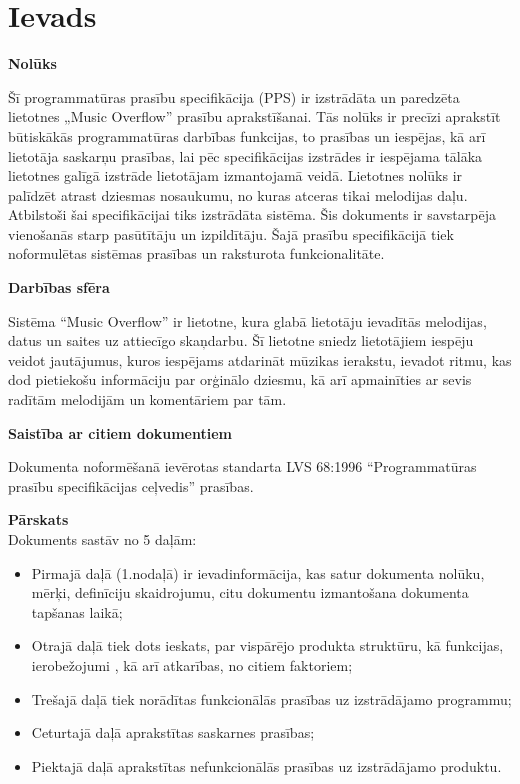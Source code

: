 \documentclass[12pt]{article}
\begin{document}
\tableofcontents

\pagebreak

\section*{Ievads}

\textbf{Nolūks}

Šī programmatūras prasību specifikācija (PPS) ir izstrādāta un paredzēta lietotnes „Music Overflow” prasību aprakstīšanai.
Tās nolūks ir precīzi aprakstīt būtiskākās programmatūras darbības funkcijas, to prasības un iespējas, kā arī lietotāja saskarņu prasības, lai pēc specifikācijas izstrādes ir iespējama tālāka lietotnes galīgā izstrāde lietotājam izmantojamā veidā.
Lietotnes nolūks ir palīdzēt atrast dziesmas nosaukumu, no kuras atceras tikai melodijas daļu.
Atbilstoši šai specifikācijai tiks izstrādāta sistēma. Šis dokuments ir savstarpēja vienošanās starp pasūtītāju un izpildītāju. Šajā prasību specifikācijā tiek noformulētas sistēmas prasības un raksturota funkcionalitāte.



\textbf{Darbības sfēra}

Sistēma ``Music Overflow'' ir lietotne, kura glabā lietotāju ievadītās melodijas, datus un saites uz attiecīgo skaņdarbu. Šī lietotne sniedz lietotājiem iespēju veidot jautājumus, kuros iespējams atdarināt mūzikas ierakstu, ievadot ritmu, kas dod pietiekošu informāciju par orģinālo dziesmu, kā arī apmainīties ar sevis radītām melodijām un komentāriem par tām.


\textbf{Saistība ar citiem dokumentiem}

Dokumenta noformēšanā ievērotas standarta LVS 68:1996 ``Programmatūras prasību specifikācijas ceļvedis'' prasības.

\textbf{Pārskats}\\
Dokuments sastāv no 5 daļām:
\begin{itemize}
\item Pirmajā daļā (1.nodaļā) ir ievadinformācija, kas satur dokumenta nolūku, mērķi, definīciju skaidrojumu, citu dokumentu izmantošana dokumenta tapšanas laikā;
\item Otrajā daļā tiek dots ieskats, par vispārējo produkta struktūru, kā funkcijas, ierobežojumi , kā arī atkarības, no citiem faktoriem;
\item Trešajā daļā tiek norādītas funkcionālās prasības uz izstrādājamo programmu;
\item Ceturtajā daļā aprakstītas saskarnes prasības;
\item Piektajā daļā aprakstītas nefunkcionālās prasības uz izstrādājamo produktu.
\end{itemize}
\end{document}
